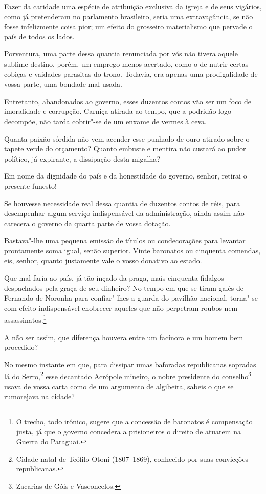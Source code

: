  Fazer da caridade uma espécie de atribuição exclusiva da igreja e de
seus vigários, como já pretenderam no parlamento brasileiro, seria uma
extravagância, se não fosse infelizmente coisa pior; um efeito do
grosseiro materialismo que pervade o país de todos os lados.

 Porventura, uma parte dessa quantia renunciada por vós não tivera
aquele sublime destino, porém, um emprego menos acertado, como o de
nutrir certas cobiças e vaidades parasitas do trono. Todavia, era
apenas uma prodigalidade de vossa parte, uma bondade mal usada. 

 Entretanto, abandonados ao governo, esses duzentos contos vão ser um
foco de imoralidade e corrupção. Carniça atirada ao tempo, que a
podridão logo decompõe, não tarda cobrir"-se de um enxame de vermes à ceva.

 Quanta paixão sórdida não vem acender esse punhado de ouro atirado
sobre o tapete verde do orçamento? Quanto embuste e mentira não custará
ao pudor político, já expirante, a dissipação desta migalha?

 Em nome da dignidade do país e da honestidade do governo, senhor,
retirai o presente funesto!

 Se houvesse necessidade real dessa quantia de duzentos contos de réis,
para desempenhar algum serviço indispensável da administração, ainda
assim não carecera o governo da quarta parte de vossa dotação. 

 Bastava"-lhe uma pequena emissão de títulos ou condecorações para
levantar prontamente soma igual, senão superior. Vinte baronatos ou
cinquenta comendas, eis, senhor, quanto justamente vale o vosso
donativo ao estado. 

 Que mal faria ao país, já tão inçado da praga, mais cinquenta fidalgos
despachados pela graça de seu dinheiro? No tempo em que se tiram galés
de Fernando de Noronha para confiar"-lhes a guarda do pavilhão
nacional, torna"-se com efeito indispensável enobrecer aqueles que não
perpetram roubos nem assassinatos.\footnote{ O trecho, todo irônico, sugere 
que a concessão de baronatos é compensação justa, já que o governo concedera 
a prisioneiros o direito de atuarem na Guerra do Paraguai.}
 
A não ser assim, que diferença houvera entre um facínora e um homem bem procedido? 

 No mesmo instante em que, para dissipar umas baforadas republicanas
sopradas lá do Serro,\footnote{ Cidade natal de Teófilo Otoni (1807--1869), 
conhecido por suas convicções republicanas.}
 esse decantado Acrópole mineiro, o nobre presidente do
conselho\footnote{ Zacarias de Góis e Vasconcelos.}
 usava de vossa carta como de um argumento de algibeira, 
sabeis o que se rumorejava na cidade?

